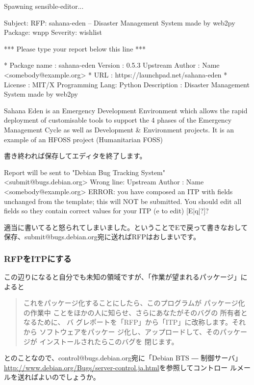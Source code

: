 \documentclass[mingoth,a4paper]{jsarticle}
\begin{document}
\begin{commandline}
Spawning sensible-editor...

Subject: RFP: sahana-eden -- Disaster Management System made by web2py
Package: wnpp
Severity: wishlist

*** Please type your report below this line ***

* Package name    : sahana-eden
  Version         : 0.5.3
  Upstream Author : Name <somebody@example.org>
* URL             : https://launchpad.net/sahana-eden
* License         : MIT/X
  Programming Lang: Python
  Description     : Disaster Management System made by web2py

Sahana Eden is an Emergency Development Environment which allows the
rapid deployment of customisable tools to support the 4 phases of the
Emergency Management Cycle as well as Development & Environment
projects. It is an example of an HFOSS project (Humanitarian FOSS)
\end{commandline}
書き終われば保存してエディタを終了します。

\begin{commandline}
Report will be sent to "Debian Bug Tracking System" <submit@bugs.debian.org>
Wrong line:   Upstream Author : Name <somebody@example.org>
ERROR: you have composed an ITP with fields unchanged from the template; this will NOT be submitted. You should
edit all fields so they contain correct values for your ITP (e to edit) [E|q|?]? 
\end{commandline}
適当に書いてると怒られてしまいました。ということでEで戻って書きなおして
保存、submit@bugs.debian.org宛に送ればRFPはおしまいです。

\subsubsection{RFPをITPにする}
この辺りになると自分でも未知の領域ですが、「作業が望まれるパッケージ」に
よると

\begin{quote}
これをパッケージ化することにしたら、このプログラムが パッケージ化の作業中
ことをほかの人に知らせ、さらにあなたがそのバグの 所有者となるために、 バ
グレポートを「RFP」から「ITP」に改称します。それから ソフトウェアをパッケー
ジ化し、アップロードして、そのパッケージが インストールされたらこのバグを
閉じます。
\end{quote}

とのことなので、control@bugs.debian.org宛に「Debian BTS ― 制御サーバ」
\url{http://www.debian.org/Bugs/server-control.ja.html}を参照してコントロー
ルメールを送ればよいのでしょうか。
\end{document}
